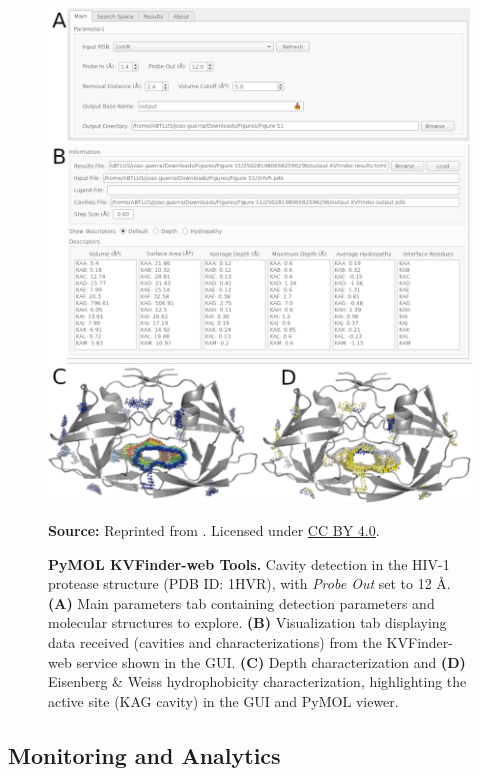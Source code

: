 \documentclass[Ingles]{phdthesis}
\begin{document}
\begin{figure}[H]
  \centering
  \includegraphics[scale=3.5]{images/pymol-kvweb-tools.png}
  \centerline{\tiny{\textbf{Source:} Reprinted from \cite{guerra2023A}. Licensed under \href{https://creativecommons.org/licenses/by/4.0/}{CC BY 4.0}.}}
  \caption[PyMOL KVFinder-web Tools]{\textbf{PyMOL KVFinder-web Tools.} Cavity detection in the HIV-1 protease structure (PDB ID: 1HVR), with \textit{Probe Out} set to 12 Å. \textbf{(A)} Main parameters tab containing detection parameters and molecular structures to explore. \textbf{(B)} Visualization tab displaying data received (cavities and characterizations) from the KVFinder-web service shown in the \acs{GUI}. \textbf{(C)} Depth characterization and \textbf{(D)} Eisenberg & Weiss hydrophobicity characterization, highlighting the active site (KAG cavity) in the \acs{GUI} and PyMOL viewer.}
  \label{fig:pymol-kvweb-tools}
\end{figure}


\subsection{Monitoring and Analytics}
\end{document}
